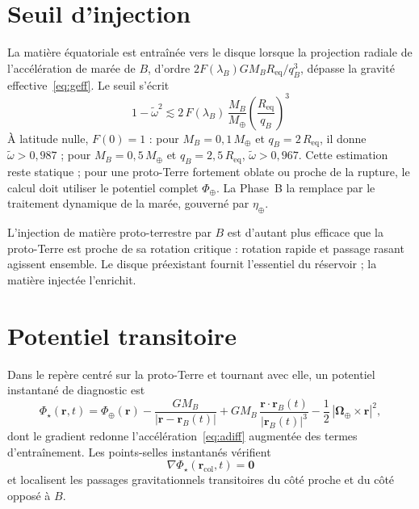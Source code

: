 \documentclass[11pt,a4paper,openany]{report}
\newcommand{\Mt}{M_{\oplus}}
\newcommand{\Req}{R_{\mathrm{eq}}}
\begin{document}
\section{Seuil d'injection}

La matière équatoriale est entraînée vers le disque lorsque la projection radiale de
l'accélération de marée de $B$, d'ordre $2F(\lambda_B)GM_B\Req/q_B^3$, dépasse la gravité
effective~\eqref{eq:geff}. Le seuil s'écrit
\begin{equation}
\boxed{\;1-\tilde\omega^2\lesssim2\,F(\lambda_B)\,\frac{M_B}{\Mt}\left(\frac{\Req}{q_B}\right)^{3}\;}
\label{eq:seuil}
\end{equation}
À latitude nulle, $F(0)=1$ : pour $M_B=0{,}1\,\Mt$ et $q_B=2\,\Req$, il donne
$\tilde\omega>0{,}987$ ; pour $M_B=0{,}5\,\Mt$ et $q_B=2{,}5\,\Req$,
$\tilde\omega>0{,}967$. Cette estimation reste statique ; pour une proto-Terre fortement oblate ou
proche de la rupture, le calcul doit utiliser le potentiel complet $\Phi_\oplus$. La Phase~B la
remplace par le traitement dynamique de la marée, gouverné par $\eta_\oplus$.

\begin{lecture}
L'injection de matière proto-terrestre par $B$ est d'autant plus efficace que la proto-Terre est
proche de sa rotation critique : rotation rapide et passage rasant agissent ensemble. Le disque
préexistant fournit l'essentiel du réservoir ; la matière injectée l'enrichit.
\end{lecture}

\section{Potentiel transitoire}

Dans le repère centré sur la proto-Terre et tournant avec elle, un potentiel instantané de
diagnostic est
\begin{equation}
\Phi_\star(\mathbf{r},t)=\Phi_\oplus(\mathbf{r})-\frac{GM_B}{|\mathbf{r}-\mathbf{r}_B(t)|}
+GM_B\,\frac{\mathbf{r}\cdot\mathbf{r}_B(t)}{|\mathbf{r}_B(t)|^3}
-\frac12\,|\boldsymbol{\Omega}_\oplus\times\mathbf{r}|^2,
\label{eq:Phistar}
\end{equation}
dont le gradient redonne l'accélération~\eqref{eq:adiff} augmentée des termes d'entraînement.
Les points-selles instantanés vérifient
\begin{equation}
\nabla\Phi_\star(\mathbf{r}_{\mathrm{col}},t)=\mathbf{0}
\label{eq:col}
\end{equation}
et localisent les passages gravitationnels transitoires du côté proche et du côté opposé à $B$.
\end{document}
